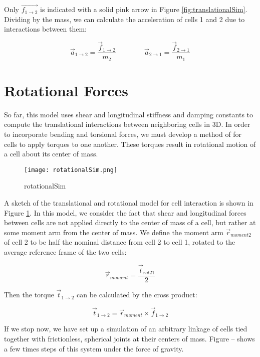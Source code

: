{Only $\vec{f_{1\rightarrow2}}$ is indicated with a solid pink arrow in Figure \ref{fig:translationalSim}.\\

Dividing by the mass, we can calculate the acceleration of cells 1 and 2 due to interactions between them:

 \[ \vec{a}_{1\rightarrow2} = \dfrac{\vec{f}_{1\rightarrow2}}{m_2} 
  \qquad\qquad
   \vec{a}_{2\rightarrow1} = \dfrac{\vec{f}_{2\rightarrow1}}{m_1} 
  \]

\section{Rotational Forces}

So far, this model uses shear and longitudinal stiffness and damping constants to compute the translational interactions between neighboring cells in 3D.  In order to incorporate bending and torsional forces, we must develop a method of for cells to apply torques to one another.  These torques result in rotational motion of a cell about its center of mass.\\

\begin{figure}
  \texttt{[image: rotationalSim.png]}
  \caption{rotationalSim}
  \label{fig:rotationalSim}
\end{figure}

A sketch of the translational and rotational model for cell interaction is shown in Figure \ref{fig:rotationalSim}.  In this model, we consider the fact that shear and longitudinal forces between cells are not applied directly to the center of mass of a cell, but rather at some moment arm from the center of mass.  We define the moment arm $\vec{r}_{moment2}$ of cell 2 to be half the nominal distance from cell 2 to cell 1, rotated to the average reference frame of the two cells:

\[ \vec{r}_{moment} = \dfrac{\vec{l}_{rot21}}{2}\]

Then the torque $\vec{t}_{1\rightarrow2}$ can be calculated by the cross product:

\[ \vec{t}_{1\rightarrow2} =  \vec{r}_{moment} \times \vec{f}_{1\rightarrow2}\]

If we stop now, we have set up a simulation of an arbitrary linkage of cells tied together with frictionless, spherical joints at their centers of mass.  Figure -- shows a few times steps of this system under the force of gravity.\\


}
